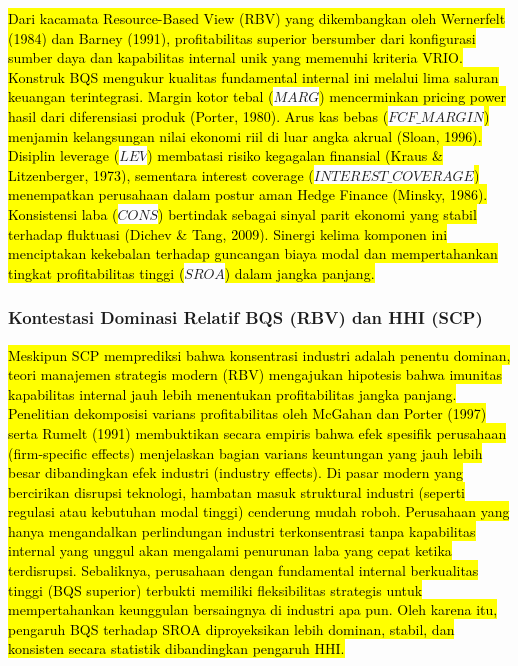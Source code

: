 \documentclass[12pt,a4paper]{article}
\begin{document}
\hl{Dari kacamata Resource-Based View (RBV) yang dikembangkan oleh Wernerfelt (1984) dan Barney (1991), profitabilitas superior bersumber dari konfigurasi sumber daya dan kapabilitas internal unik yang memenuhi kriteria VRIO. Konstruk BQS mengukur kualitas fundamental internal ini melalui lima saluran keuangan terintegrasi. Margin kotor tebal (}$MARG$\hl{) mencerminkan pricing power hasil dari diferensiasi produk (Porter, 1980). Arus kas bebas (}$FCF\_MARGIN$\hl{) menjamin kelangsungan nilai ekonomi riil di luar angka akrual (Sloan, 1996). Disiplin leverage (}$LEV$\hl{) membatasi risiko kegagalan finansial (Kraus \& Litzenberger, 1973), sementara interest coverage (}$INTEREST\_COVERAGE$\hl{) menempatkan perusahaan dalam postur aman Hedge Finance (Minsky, 1986). Konsistensi laba (}$CONS$\hl{) bertindak sebagai sinyal parit ekonomi yang stabil terhadap fluktuasi (Dichev \& Tang, 2009). Sinergi kelima komponen ini menciptakan kekebalan terhadap guncangan biaya modal dan mempertahankan tingkat profitabilitas tinggi (}$SROA$\hl{) dalam jangka panjang.}

\subsubsection{Kontestasi Dominasi Relatif BQS (RBV) dan HHI
(SCP)}\label{kontestasi-dominasi-relatif-bqs-rbv-dan-hhi-scp}

\hl{Meskipun SCP memprediksi bahwa konsentrasi industri adalah penentu dominan, teori manajemen strategis modern (RBV) mengajukan hipotesis bahwa imunitas kapabilitas internal jauh lebih menentukan profitabilitas jangka panjang. Penelitian dekomposisi varians profitabilitas oleh McGahan dan Porter (1997) serta Rumelt (1991) membuktikan secara empiris bahwa efek spesifik perusahaan (firm-specific effects) menjelaskan bagian varians keuntungan yang jauh lebih besar dibandingkan efek industri (industry effects). Di pasar modern yang bercirikan disrupsi teknologi, hambatan masuk struktural industri (seperti regulasi atau kebutuhan modal tinggi) cenderung mudah roboh. Perusahaan yang hanya mengandalkan perlindungan industri terkonsentrasi tanpa kapabilitas internal yang unggul akan mengalami penurunan laba yang cepat ketika terdisrupsi. Sebaliknya, perusahaan dengan fundamental internal berkualitas tinggi (BQS superior) terbukti memiliki fleksibilitas strategis untuk mempertahankan keunggulan bersaingnya di industri apa pun. Oleh karena itu, pengaruh BQS terhadap SROA diproyeksikan lebih dominan, stabil, dan konsisten secara statistik dibandingkan pengaruh HHI.}
\end{document}
